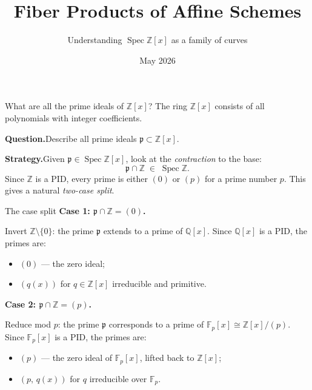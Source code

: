 \documentclass[aspectratio=169,12pt]{beamer}
\title{Fiber Products of Affine Schemes}
\subtitle{Understanding $\operatorname{Spec}\mathbb{Z}[x]$ as a family of curves}
\author{}
\date{May 2026}
\begin{document}
\begin{frame}[plain]
  \titlepage
\end{frame}

\begin{frame}{What are all the prime ideals of $\mathbb{Z}[x]$?}
  The ring $\mathbb{Z}[x]$ consists of all polynomials with integer coefficients.

  \bigskip

  \textbf{Question.}\enspace Describe all prime ideals
  $\mathfrak{p} \subset \mathbb{Z}[x]$.

  \bigskip

  \textbf{Strategy.}\enspace Given $\mathfrak{p} \in \operatorname{Spec}\mathbb{Z}[x]$,
  look at the \emph{contraction} to the base:
  \[
    \mathfrak{p} \cap \mathbb{Z} \;\in\; \operatorname{Spec}\mathbb{Z}.
  \]
  Since $\mathbb{Z}$ is a PID, every prime is either $(0)$
  or $(p)$ for a prime number $p$.
  This gives a natural \emph{two-case split}.
\end{frame}

\begin{frame}{The case split}
  \textbf{Case 1: $\mathfrak{p} \cap \mathbb{Z} = (0)$.}

  \smallskip
  Invert $\mathbb{Z}\setminus\{0\}$: the prime $\mathfrak{p}$ extends to a prime
  of $\mathbb{Q}[x]$.
  Since $\mathbb{Q}[x]$ is a PID, the primes are:
  \begin{itemize}
    \item $(0)$ — the zero ideal;
    \item $(q(x))$ for $q \in \mathbb{Z}[x]$ irreducible and primitive.
  \end{itemize}

  \bigskip

  \textbf{Case 2: $\mathfrak{p} \cap \mathbb{Z} = (p)$.}

  \smallskip
  Reduce mod $p$: the prime $\mathfrak{p}$ corresponds to a prime of
  $\mathbb{F}_{p}[x] \cong \mathbb{Z}[x]/(p)$.
  Since $\mathbb{F}_{p}[x]$ is a PID, the primes are:
  \begin{itemize}
    \item $(p)$ — the zero ideal of $\mathbb{F}_{p}[x]$, lifted back to $\mathbb{Z}[x]$;
    \item $(p,\,q(x))$ for $q$ irreducible over $\mathbb{F}_{p}$.
  \end{itemize}
\end{frame}
\end{document}
